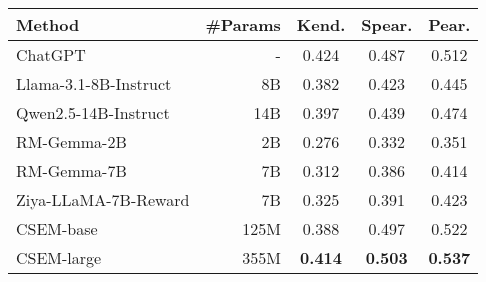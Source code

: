 
\begin{NiceTabular}{lrccc}
\toprule[1.1pt]
Method       &\#Params    & Kend. & Spear. & Pear. \\  \midrule
ChatGPT       & -  &0.424 &0.487  &0.512       \\  \hdashline
Llama-3.1-8B-Instruct &8B  &0.382   &0.423   &0.445       \\
Qwen2.5-14B-Instruct  & 14B    &0.397       &0.439        &0.474       \\  \hdashline
RM-Gemma-2B    &2B  &0.276  &0.332 & 0.351       \\
RM-Gemma-7B    &7B  &0.312  &0.386 & 0.414       \\
Ziya-LLaMA-7B-Reward &7B  &0.325  &0.391 &0.423       \\  \hdashline
CSEM-base       &125M   &0.388  &0.497 &0.522       \\
CSEM-large      &355M   &\textbf{0.414}  &\textbf{0.503} &\textbf{0.537}      \\  
\bottomrule[1.1pt]
\end{NiceTabular}